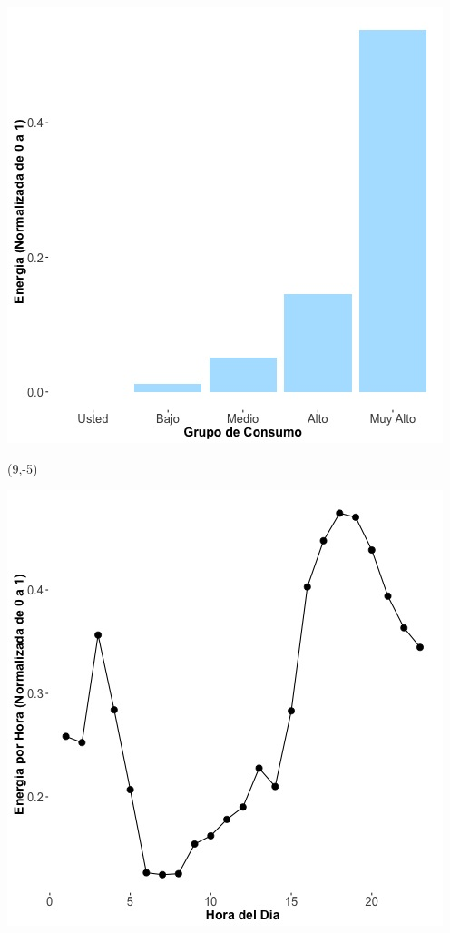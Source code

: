 \documentclass{article}\usepackage[]{graphicx}\usepackage[]{color}
\newenvironment{knitrout}{}{} %
\begin{document}
\begin{knitrout}
\color{fgcolor}
\includegraphics[scale=0.65]{figure/A8_neighbor_plot} 
\end{knitrout}

 \begin{textblock}{1}(9,-5)
\begin{minipage}{20em}
\begingroup

\endgroup
\end{minipage}
\end{textblock}


\begin{knitrout}
\color{fgcolor}
\includegraphics[scale=0.65]{figure/A8_plot_norm_median} 
\end{knitrout}
\end{document}
